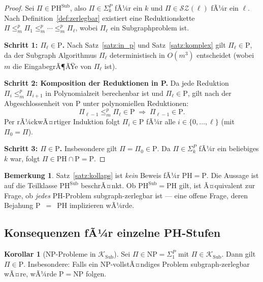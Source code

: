 ﻿\documentclass[a4paper,12pt]{article}
\theoremstyle{definition}
\newtheorem{bemerkung}{Bemerkung}
\newtheorem{korollar}{Korollar}
\begin{document}
\begin{proof}
  Sei $\Pi \in \mathrm{PH}^{\mathrm{Sub}}$, also $\Pi \in \Sigma_k^P$ fÃ¼r ein $k$
  und $\Pi \in \mathcal{SZ}(\ell)$ fÃ¼r ein $\ell$.
  Nach Definition~\ref{def:zerlegbar} existiert eine Reduktionskette
  $\Pi \leq_m^p \Pi_1 \leq_m^p \cdots \leq_m^p \Pi_\ell$,
  wobei $\Pi_\ell$ ein Subgraphproblem ist.

  \textbf{Schritt 1: $\Pi_\ell \in \mathrm{P}$.}
  Nach Satz~\ref{satz:in_p} und Satz~\ref{satz:komplex} gilt
  $\Pi_\ell \in \mathrm{P}$, da der Subgraph Algorithmus $\Pi_\ell$
  deterministisch in $O(m^3)$ entscheidet (wobei $m$ die EingabegrÃ¶ÃŸe von $\Pi_\ell$ ist).

  \textbf{Schritt 2: Komposition der Reduktionen in P.}
  Da jede Reduktion $\Pi_i \leq_m^p \Pi_{i+1}$ in Polynomialzeit berechenbar ist
  und $\Pi_\ell \in \mathrm{P}$, gilt nach der Abgeschlossenheit von P
  unter polynomiellen Reduktionen:
  \[
    \Pi_{\ell-1} \leq_m^p \Pi_\ell \in \mathrm{P} \;\Rightarrow\; \Pi_{\ell-1} \in \mathrm{P}.
  \]
  Per rÃ¼ckwÃ¤rtiger Induktion folgt $\Pi_i \in \mathrm{P}$ fÃ¼r alle
  $i \in \{0, \ldots, \ell\}$ (mit $\Pi_0 = \Pi$).

  \textbf{Schritt 3: $\Pi \in \mathrm{P}$.}
  Insbesondere gilt $\Pi = \Pi_0 \in \mathrm{P}$.
  Da $\Pi \in \Sigma_k^P$ fÃ¼r ein beliebiges $k$ war,
  folgt $\Pi \in \mathrm{PH} \cap \mathrm{P} = \mathrm{P}$.
\end{proof}

\begin{bemerkung}
  Satz~\ref{satz:kollaps} ist \emph{kein} Beweis fÃ¼r $\mathrm{PH} = \mathrm{P}$.
  Die Aussage ist auf die Teilklasse $\mathrm{PH}^{\mathrm{Sub}}$ beschrÃ¤nkt.
  Ob $\mathrm{PH}^{\mathrm{Sub}} = \mathrm{PH}$ gilt, ist Ã¤quivalent zur Frage,
  ob \emph{jedes} PH-Problem subgraph-zerlegbar ist --- eine offene Frage,
  deren Bejahung P~$=$~PH implizieren wÃ¼rde.
\end{bemerkung}

\subsection{Konsequenzen fÃ¼r einzelne PH-Stufen}

\begin{korollar}[NP-Probleme in $\mathcal{K}_\mathrm{Sub}$]
\label{kor:np}
  Sei $\Pi \in \mathrm{NP} = \Sigma_1^P$ mit $\Pi \in \mathcal{K}_\mathrm{Sub}$.
  Dann gilt $\Pi \in \mathrm{P}$.
  Insbesondere: Falls ein NP-vollstÃ¤ndiges Problem subgraph-zerlegbar wÃ¤re,
  wÃ¼rde $\mathrm{P} = \mathrm{NP}$ folgen.
\end{korollar}
\end{document}
